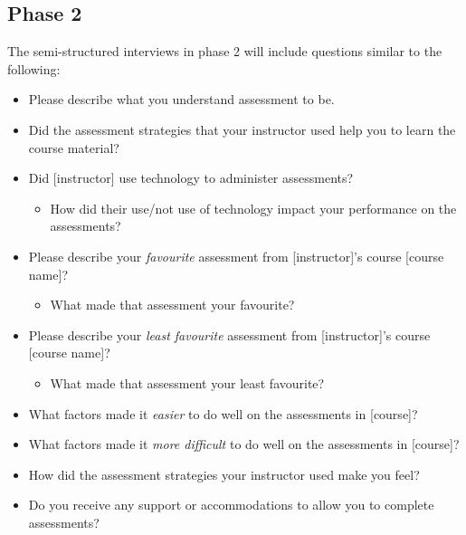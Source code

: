 \documentclass[
]{book}
\providecommand{\tightlist}{%
  \setlength{\itemsep}{0pt}\setlength{\parskip}{0pt}}
\begin{document}
\hypertarget{phase-2}{%
\subsection*{Phase 2}\label{phase-2}}

The semi-structured interviews in phase 2 will include questions similar to the following:

\begin{itemize}
\tightlist
\item
  Please describe what you understand assessment to be.
\item
  Did the assessment strategies that your instructor used help you to learn the course material?
\item
  Did {[}instructor{]} use technology to administer assessments?

  \begin{itemize}
  \tightlist
  \item
    How did their use/not use of technology impact your performance on the assessments?
  \end{itemize}
\item
  Please describe your \emph{favourite} assessment from {[}instructor{]}'s course {[}course name{]}?

  \begin{itemize}
  \tightlist
  \item
    What made that assessment your favourite?
  \end{itemize}
\item
  Please describe your \emph{least favourite} assessment from {[}instructor{]}'s course {[}course name{]}?

  \begin{itemize}
  \tightlist
  \item
    What made that assessment your least favourite?
  \end{itemize}
\item
  What factors made it \emph{easier} to do well on the assessments in {[}course{]}?
\item
  What factors made it \emph{more difficult} to do well on the assessments in {[}course{]}?
\item
  How did the assessment strategies your instructor used make you feel?
\item
  Do you receive any support or accommodations to allow you to complete assessments?
\end{itemize}
\end{document}
